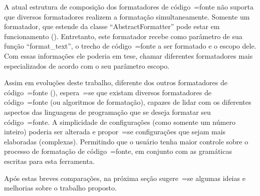 A atual estrutura de composição dos formatadores de código~=fonte não suporta que diversos formatadores realizem a formatação simultaneamente.
Somente um formatador,
que estende da classe ``AbstractFormatter'' pode estar em funcionamento ().
Entretanto,
este formatador recebe como parâmetro de sua função ``format\_text'',
o trecho de código~=fonte a ser formatado e
o escopo dele.
Com essas informações ele poderia em tese,
chamar diferentes formatadores mais especializados de acordo com o seu parâmetro escopo.

Assim em evoluções deste trabalho,
diferente dos outros formatadores de código~=fonte (),
espera~=se que existam diversos formatadores de código~=fonte (ou algoritmos de formatação),
capazes de lidar com os diferentes aspectos das linguagens de programação que se deseja formatar seu código~=fonte.
A simplicidade de configurações (como somente um número inteiro) poderia ser alterada e
propor~=se configurações que sejam mais elaboradas (complexas).
Permitindo que o usuário tenha maior controle sobre o processo de formatação de código~=fonte,
em conjunto com as gramáticas escritas para esta ferramenta.

Após estas breves comparações,
na próxima seção sugere~=se algumas ideias e
melhorias sobre o trabalho proposto.


\section{}
\label{section:trabalhosFuturos}


